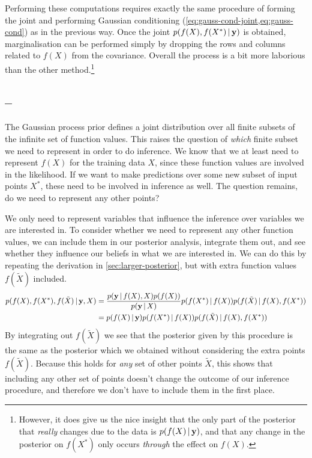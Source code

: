 \documentclass[a4paper]{article}
\newcommand{\questionref}[1]{\Cref{#1} -- \nameref{#1}}
\theoremstyle{definition}
\begin{document}
Performing these computations requires exactly the same procedure of forming the joint and performing Gaussian conditioning (\cref{eq:gauss-cond-joint,eq:gauss-cond}) as in the previous way. 
Once the joint $p(f(X), f(X^*)\,|\, \mathbf{y})$ is obtained, marginalisation can be performed simply by dropping the rows and columns related to $f(X)$ from the covariance. Overall the process is a bit more laborious than the other method.\footnote{However, it does give us the nice insight that the only part of the posterior that \emph{really} changes due to the data is $p(f(X)\,|\,\mathbf{y})$, and that any change in the posterior on $f(X^*)$ only occurs \emph{through} the effect on $f(X)$.}



\subsection{\questionref{q:marginalisation}}
The Gaussian process prior defines a joint distribution over all finite subsets of the infinite set of function values. This raises the question of \emph{which} finite subset we need to represent in order to do inference. We know that we at least need to represent $f(X)$ for the training data $X$, since these function values are involved in the likelihood. If we want to make predictions over some new subset of input points $X^*$, these need to be involved in inference as well. The question remains, do we need to represent any other points?

We only need to represent variables that influence the inference over variables we are interested in. To consider whether we need to represent any other function values, we can include them in our posterior analysis, integrate them out, and see whether they influence our beliefs in what we are interested in. We can do this by repeating the derivation in \cref{sec:larger-posterior}, but with extra function values $f(\tilde{X})$ included.
\begin{align}
p(f(X), f(X^*), f(\tilde{X})\,|\, \mathbf{y}, X) &= \frac{p(\mathbf{y}\,|\, f(X), X) p(f(X))}{p(\mathbf{y}\,|\, X)} p(f(X^*)\,|\, f(X)) p(f(\tilde X)\,|\, f(X), f(X^*)) \\
&= p(f(X)\,|\, \mathbf{y}) p(f(X^*)\,|\, f(X)) p(f(\tilde X)\,|\, f(X), f(X^*))
\end{align}
By integrating out $f(\tilde X)$ we see that the posterior given by this procedure is the same as the posterior which we obtained without considering the extra points $f(\tilde X)$. Because this holds for \emph{any} set of other points $\tilde X$, this shows that including any other set of points doesn't change the outcome of our inference procedure, and therefore we don't have to include them in the first place.
\end{document}
